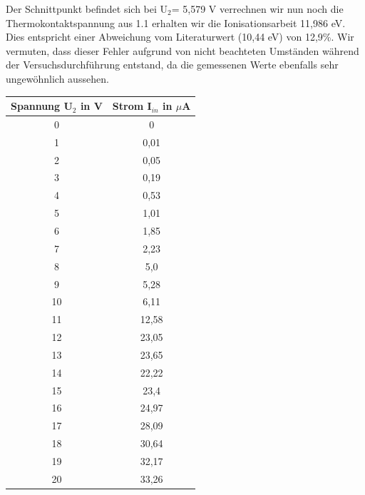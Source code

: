 Der Schnittpunkt befindet sich bei U$ _2 $= 5,579 V verrechnen wir nun noch die Thermokontaktspannung aus 1.1 erhalten wir die Ionisationsarbeit  11,986 eV. Dies entspricht einer Abweichung vom Literaturwert (10,44 eV) von 12,9\%. Wir vermuten, dass dieser Fehler aufgrund von nicht beachteten Umständen während der Versuchsdurchführung entstand, da die gemessenen Werte ebenfalls sehr ungewöhnlich aussehen.
\begin{center}
	\begin{tabular}{|c|c|}
		\hline
		Spannung U$_2$ in V & Strom I$_{in}$ in $\mu$A \\ \hline
		0          &            0             \\ \hline
		1          &           0,01           \\ \hline
		2          &           0,05           \\ \hline
		3          &           0,19           \\ \hline
		4          &           0,53           \\ \hline
		5          &           1,01           \\ \hline
		6          &           1,85           \\ \hline
		7          &           2,23           \\ \hline
		8          &           5,0            \\ \hline
		9          &           5,28           \\ \hline
		10          &           6,11           \\ \hline
		11          &          12,58           \\ \hline
		12          &          23,05           \\ \hline
		13          &          23,65           \\ \hline
		14          &          22,22           \\ \hline
		15          &           23,4           \\ \hline
		16          &          24,97           \\ \hline
		17          &          28,09           \\ \hline
		18          &          30,64           \\ \hline
		19          &          32,17           \\ \hline
		20          &          33,26           \\ \hline
	\end{tabular} 
\end{center}
